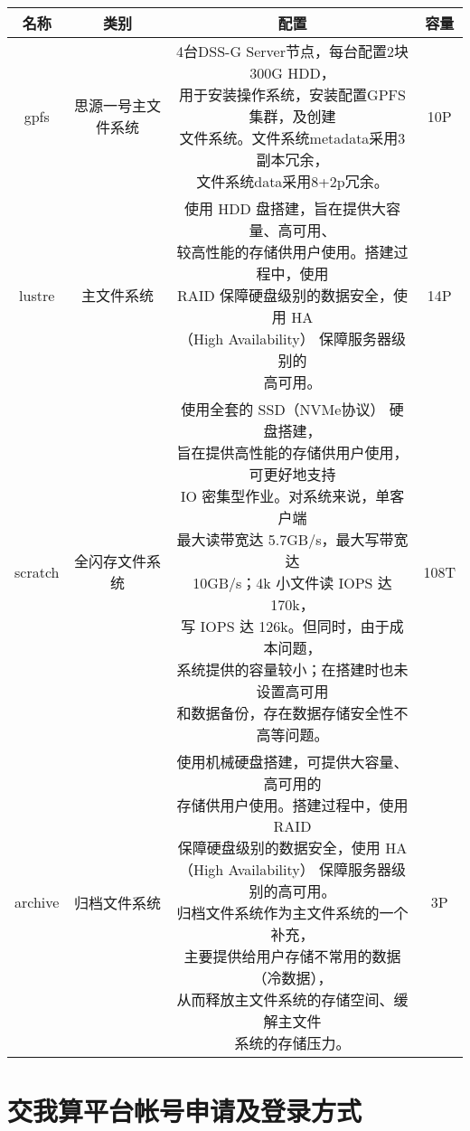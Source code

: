 \documentclass[cn, 12pt, hang, black, chinese]{elegantbook}
\begin{document}
\begin{table2}
\begin{tabular}{ |c|c|c|c| }
 \hline
 名称 & 类别 & 配置 & 容量 \\
 \hline \hline
 gpfs & 思源一号主文件系统 & \makecell[l]{4台DSS-G Server节点，每台配置2块300G HDD，\\ 用于安装操作系统，安装配置GPFS集群，及创建\\ 文件系统。文件系统metadata采用3副本冗余，\\ 文件系统data采用8+2p冗余。} & 10P\\
 \hline
 lustre & 主文件系统 & \makecell[l]{使用 HDD 盘搭建，旨在提供大容量、高可用、\\较高性能的存储供用户使用。搭建过程中，使用\\ RAID 保障硬盘级别的数据安全，使用 HA\\（High Availability） 保障服务器级别的\\高可用。} & 14P\\
 \hline
 scratch & 全闪存文件系统 & \makecell[l]{使用全套的 SSD（NVMe协议） 硬盘搭建，\\旨在提供高性能的存储供用户使用，可更好地支持\\ IO 密集型作业。对系统来说，单客户端\\最大读带宽达 5.7GB/s，最大写带宽达\\ 10GB/s；4k 小文件读 IOPS 达 170k，\\写 IOPS 达 126k。但同时，由于成本问题，\\系统提供的容量较小；在搭建时也未设置高可用\\和数据备份，存在数据存储安全性不高等问题。} & 108T\\
 \hline
 archive & 归档文件系统 & \makecell[l]{使用机械硬盘搭建，可提供大容量、高可用的\\存储供用户使用。搭建过程中，使用 RAID \\保障硬盘级别的数据安全，使用 HA\\（High Availability） 保障服务器级别的高可用。\\归档文件系统作为主文件系统的一个补充，\\主要提供给用户存储不常用的数据（冷数据），\\从而释放主文件系统的存储空间、缓解主文件\\系统的存储压力。} & 3P\\
 \hline
\end{tabular}
\end{table2}

\chapter{交我算平台帐号申请及登录方式}
\end{document}

